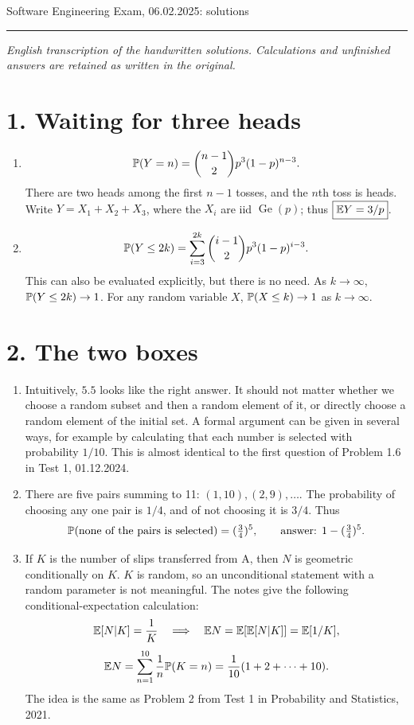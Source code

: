 \documentclass[a4paper]{article}
\begin{document}
\noindent Software Engineering \hfill Exam, 06.02.2025: solutions
\par\smallskip\hrule\smallskip\noindent

\textit{English transcription of the handwritten solutions. Calculations and unfinished answers are retained as written in the original.}

\section*{1. Waiting for three heads}
\begin{enumerate}
\item
\[
\P(Y=n)=\binom{n-1}{2}p^3(1-p)^{n-3}.
\]
There are two heads among the first $n-1$ tosses, and the $n$th toss is heads.
Write $Y=X_1+X_2+X_3$, where the $X_i$ are iid $\operatorname{Ge}(p)$; thus $\boxed{\E Y=3/p}$.
\item
\[
\P(Y\leq2k)=\sum_{i=3}^{2k}\binom{i-1}{2}p^3(1-p)^{i-3}.
\]
This can also be evaluated explicitly, but there is no need. As $k\to\infty$, $\P(Y\leq2k)\to1$.
For any random variable $X$, $\P(X\leq k)\to1$ as $k\to\infty$.
\end{enumerate}

\section*{2. The two boxes}
\begin{enumerate}
\item Intuitively, $5.5$ looks like the right answer. It should not matter whether we choose a random subset and then a random element of it, or directly choose a random element of the initial set. A formal argument can be given in several ways, for example by calculating that each number is selected with probability $1/10$. This is almost identical to the first question of Problem 1.6 in Test 1, 01.12.2024.
\item There are five pairs summing to 11: $(1,10),(2,9),\dots$.
The probability of choosing any one pair is $1/4$, and of not choosing it is $3/4$.
Thus
\[
\P(\text{none of the pairs is selected})=(\tfrac34)^5,
\qquad
\text{answer: }1-(\tfrac34)^5.
\]
\item If $K$ is the number of slips transferred from A, then $N$ is geometric conditionally on $K$.
$K$ is random, so an unconditional statement with a random parameter is not meaningful.
The notes give the following conditional-expectation calculation:
\[
\E[N|K]=\frac1K
\quad\Longrightarrow\quad
\E N=\E[\E[N|K]]=\E[1/K],
\]
\[
\E N=\sum_{n=1}^{10}\frac1n\P(K=n)
=\frac1{10}(1+2+\dots+10).
\]
The idea is the same as Problem 2 from Test 1 in Probability and Statistics, 2021.
\end{enumerate}
\end{document}
